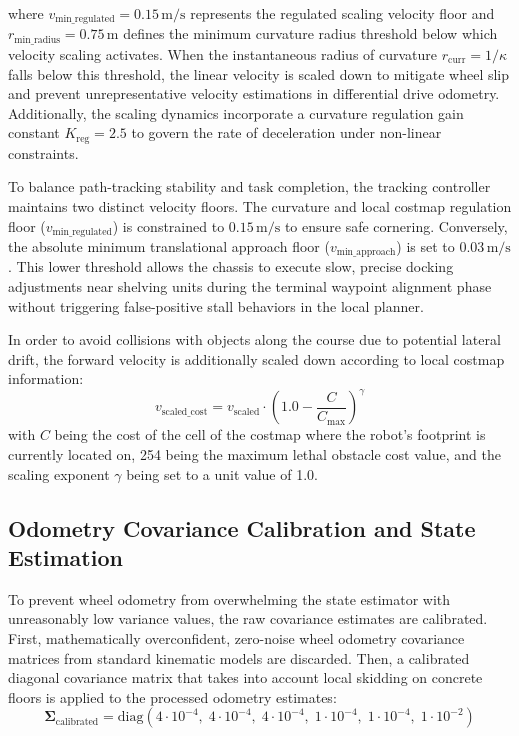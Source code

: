 where $v_{\text{min\_regulated}} = 0.15\,\text{m/s}$ represents the regulated scaling velocity floor and \\ $r_{\text{min\_radius}} = 0.75\,\text{m}$ defines the minimum curvature radius threshold below which velocity scaling activates. When the instantaneous radius of curvature $r_{\text{curr}} = 1/\kappa$ falls below this threshold, the linear velocity is scaled down to mitigate wheel slip and prevent unrepresentative velocity estimations in differential drive odometry. Additionally, the scaling dynamics incorporate a curvature regulation gain constant $K_{\text{reg}} = 2.5$ to govern the rate of deceleration under non-linear constraints.

To balance path-tracking stability and task completion, the tracking controller maintains two distinct velocity floors. The curvature and local costmap regulation floor {\small ($v_{\text{min\_regulated}}$)} is constrained to $0.15\,\text{m/s}$ to ensure safe cornering. Conversely, the absolute minimum translational approach floor ($v_{\text{min\_approach}}$) is set to $0.03\,\text{m/s}$. This lower threshold allows the chassis to execute slow, precise docking adjustments near shelving units during the terminal waypoint alignment phase without triggering false-positive stall behaviors in the local planner.

In order to avoid collisions with objects along the course due to potential lateral drift, the forward velocity is additionally scaled down according to local costmap information:
\begin{equation}
v_{\text{scaled\_cost}} = v_{\text{scaled}} \cdot \left(1.0 - \frac{C}{C_{\text{max}}}\right)^{\gamma} \label{eq:cost_scaling}
\end{equation}
with $C$ being the cost of the cell of the costmap where the robot's footprint is currently located on, 254 being the maximum lethal obstacle cost value, and the scaling exponent $\gamma$ being set to a unit value of 1.0.

\subsection{Odometry Covariance Calibration and State Estimation}

To prevent wheel odometry from overwhelming the state estimator with unreasonably low variance values, the raw covariance estimates are calibrated. First, mathematically overconfident, zero-noise wheel odometry covariance matrices from standard kinematic models are discarded. Then, a calibrated diagonal covariance matrix that takes into account local skidding on concrete floors is applied to the processed odometry estimates:
\begin{equation}
\boldsymbol{\Sigma}_{\text{calibrated}} = \text{diag}\left(4\cdot10^{-4},\; 4\cdot10^{-4},\; 4\cdot10^{-4},\; 1\cdot10^{-4},\; 1\cdot10^{-4},\; 1\cdot10^{-2}\right) \label{eq:calibrated_covariance_matrix}
\end{equation}

